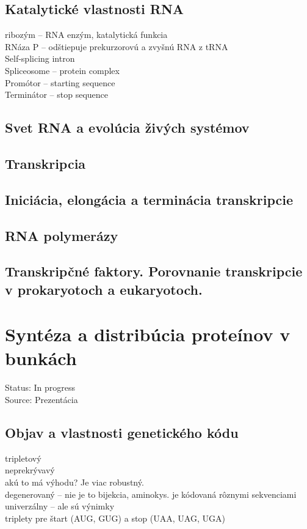 \subsection*{Katalytické vlastnosti RNA}
ribozým -- RNA enzým, katalytická funkcia\\
RNáza P -- odštiepuje prekurzorovú a zvyšnú RNA z tRNA\\
Self-splicing intron\\
Spliceosome -- protein complex\\
Promótor -- starting sequence\\
Terminátor -- stop sequence\\
\subsection*{Svet RNA a evolúcia živých systémov}

\subsection*{Transkripcia}

\subsection*{Iniciácia, elongácia a terminácia transkripcie}

\subsection*{RNA polymerázy}

\subsection*{Transkripčné faktory. Porovnanie transkripcie v prokaryotoch a eukaryotoch.}

\section{Syntéza a distribúcia proteínov v bunkách}

Status: In progress\\
Source: Prezentácia \\

\subsection*{Objav a vlastnosti genetického kódu}
tripletový\\
neprekrývavý\\
\tab akú to má výhodu? Je viac robustný. \\
degenerovaný -- nie je to bijekcia, aminokys. je kódovaná rôznymi sekvenciami\\
univerzálny -- ale sú výnimky\\
triplety pre štart (AUG, GUG) a stop (UAA, UAG, UGA)\\

